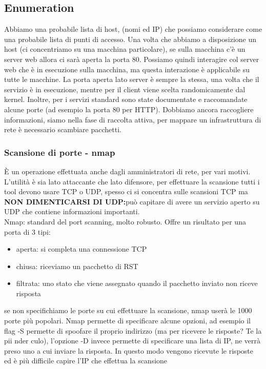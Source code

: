\documentclass{article}
\begin{document}
\subsection{Enumeration}
Abbiamo una probabile lista di host, (nomi ed IP) che possiamo considerare come una probabile lista di punti di accesso. Una volta che abbiamo a disposizione un host (ci concentriamo su una macchina particolare), se sulla macchina c'è un server web allora ci sarà aperta la porta 80. Possiamo quindi interagire col server web che è in esecuzione sulla macchina, ma questa interazione è applicabile su tutte le macchine. La porta aperta lato server è sempre la stessa, una volta che il servizio è in esecuzione, mentre per il client viene scelta randomicamente dal kernel. Inoltre, per i servizi standard sono state documentate e raccomandate alcune porte (ad esempio la porta 80 per HTTP). Dobbiamo ancora raccogliere informazioni, siamo nella fase di raccolta attiva, per mappare un infrastruttura di rete è necessario scambiare pacchetti.
\subsubsection{Scansione di porte - nmap}
È un operazione effettuata anche dagli amministratori di rete, per vari motivi. L'utilità è sia lato attaccante che lato difensore, per effettuare la scansione tutti i tool devono usare TCP o UDP, spesso ci si concentra sulle scansioni TCP ma \textbf{NON DIMENTICARSI DI UDP:}può capitare di avere un servizio aperto su UDP che contiene informazioni importanti.\\ Nmap: standard del port scanning, molto robusto. Offre un risultato per una porta di 3 tipi:
\begin{itemize}
\item aperta: si completa una connessione TCP
\item chiusa: riceviamo un pacchetto di RST
\item filtrata: uno stato che viene assegnato quando il pacchetto inviato non riceve risposta
\end{itemize}
se non specifichiamo le porte su cui effettuare la scansione, nmap userà le 1000 porte più popolari. Nmap permette di specificare alcune opzioni, ad esempio il flag -S permette di spoofare il proprio indirizzo (ma per ricevere le risposte? Te la pii nder culo), l'opzione -D invece permette di specificare una lista di IP, ne verrà preso uno a cui inviare la risposta. In questo modo vengono ricevute le risposte ed è più difficile capire l'IP che effettua la scansione
\end{document}
